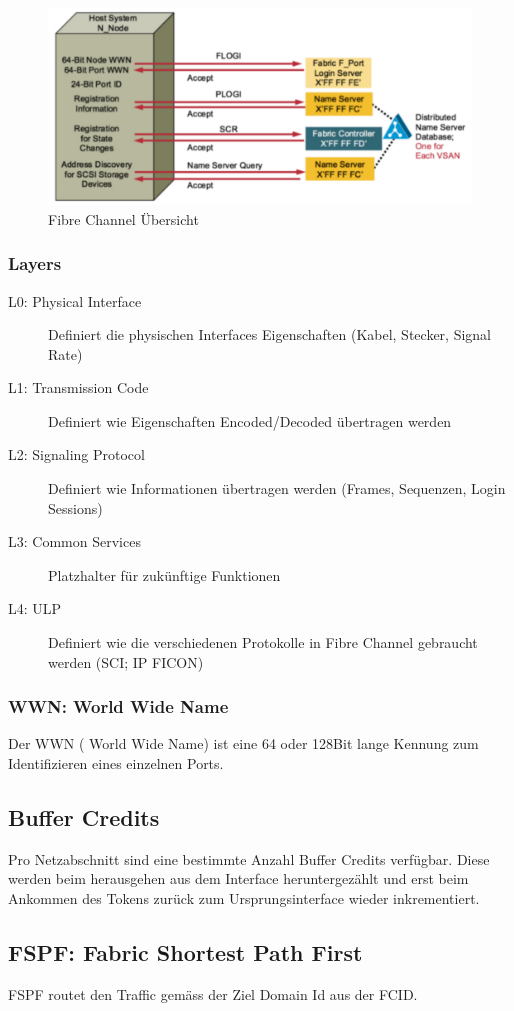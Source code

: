 \begin{figure}[h]
	\centering
	\includegraphics[width=0.7\linewidth]{images/flog_plogi_2}
	\caption{Fibre Channel Übersicht}
\end{figure}


\subsubsection{Layers}
\begin{description}
	\item[L0: Physical Interface] Definiert die physischen Interfaces Eigenschaften (Kabel,	Stecker, Signal	Rate)
	\item[L1: Transmission Code] Definiert wie Eigenschaften Encoded/Decoded übertragen werden
	\item[L2: Signaling Protocol] Definiert wie Informationen übertragen werden (Frames, Sequenzen, Login Sessions)
	\item[L3: Common Services] Platzhalter für zukünftige Funktionen
	\item[L4: ULP] Definiert wie die verschiedenen Protokolle in Fibre Channel gebraucht werden (SCI; IP FICON)
\end{description}

\subsubsection{WWN: World Wide Name}
Der WWN ( World Wide Name) ist eine 64 oder 128Bit lange Kennung zum Identifizieren eines einzelnen Ports. 

\subsection{Buffer Credits}
Pro Netzabschnitt sind eine bestimmte Anzahl Buffer Credits verfügbar. Diese werden beim herausgehen aus dem Interface heruntergezählt und erst beim Ankommen des Tokens zurück zum Ursprungsinterface wieder inkrementiert.

\subsection{FSPF: Fabric Shortest Path First}
FSPF routet den Traffic gemäss der Ziel Domain Id aus der FCID.


